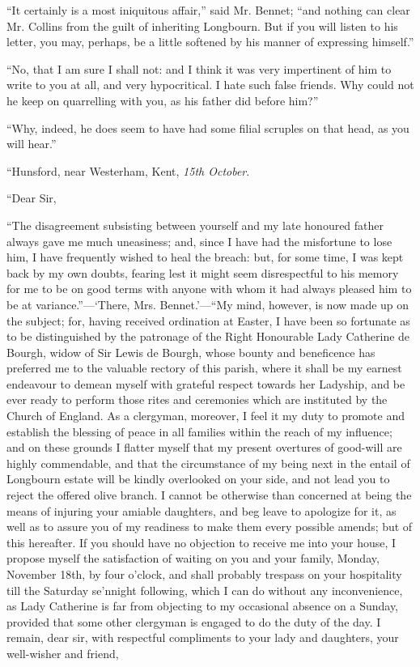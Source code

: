 \documentclass[12pt,openright]{book}
\begin{document}
“It certainly is a most iniquitous affair,” said Mr. Bennet; “and nothing can clear Mr. Collins from the guilt of inheriting Longbourn. But if you will listen to his letter, you may, perhaps, be a little softened by his manner of expressing himself.”

“No, that I am sure I shall not: and I think it was very impertinent of him to write to you at all, and very hypocritical. I hate such false friends. Why could not he keep on quarrelling with you, as his father did before him?”

“Why, indeed, he does seem to have had some filial scruples on that head, as you will hear.”

“Hunsford, near Westerham, Kent, \textit{15th October}.

“Dear Sir,


“The disagreement subsisting between yourself and my late honoured father always gave me much uneasiness; and, since I have had the misfortune to lose him, I have frequently wished to heal the breach: but, for some time, I was kept back by my own doubts, fearing lest it might seem disrespectful to his memory for me to be on good terms with anyone with whom it had always pleased him to be at variance.”—‘There, Mrs. Bennet.’—“My mind, however, is now made up on the subject; for, having received ordination at Easter, I have been so fortunate as to be distinguished by the patronage of the Right Honourable Lady Catherine de Bourgh, widow of Sir Lewis de Bourgh, whose bounty and beneficence has preferred me to the valuable rectory of this parish, where it shall be my earnest endeavour to demean myself with grateful respect towards her Ladyship, and be ever ready to perform those rites and ceremonies which are instituted by the Church of England. As a clergyman, moreover, I feel it my duty to promote and establish the blessing of peace in all families within the reach of my influence; and on these grounds I flatter myself that my present overtures of good-will are highly commendable, and that the circumstance of my being next in the entail of Longbourn estate will be kindly overlooked on your side, and not lead you to reject the offered olive branch. I cannot be otherwise than concerned at being the means of injuring your amiable daughters, and beg leave to apologize for it, as well as to assure you of my readiness to make them every possible amends; but of this hereafter. If you should have no objection to receive me into your house, I propose myself the satisfaction of waiting on you and your family, Monday, November 18th, by four o’clock, and shall probably trespass on your hospitality till the Saturday se’nnight following, which I can do without any inconvenience, as Lady Catherine is far from objecting to my occasional absence on a Sunday, provided that some other clergyman is engaged to do the duty of the day. I remain, dear sir, with respectful compliments to your lady and daughters, your well-wisher and friend,
\end{document}
